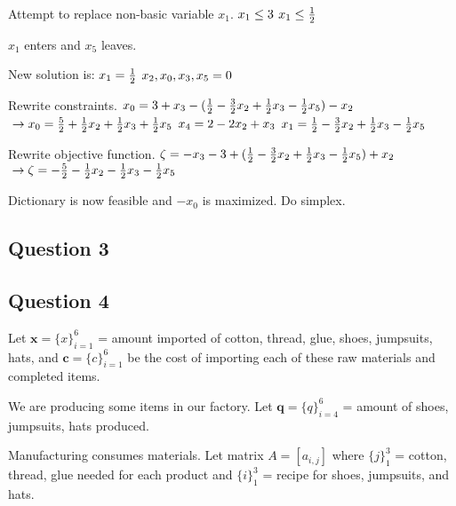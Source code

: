 \documentclass[17pt]{extarticle}
\begin{document}
\bigskip Attempt to replace non-basic variable $x_1$.
$\\ x_1 \leq 3$
$\\ x_1 \leq \frac{1}{2}$

\bigskip $x_1$ enters and $x_5$ leaves.

\bigskip New solution is:
$\\x_1 = \frac{1}{2}$
$\\x_2, x_0, x_3, x_5 = 0$

\bigskip Rewrite constraints.
$\\ x_0 = 3 + x_3 - (\frac{1}{2} - \frac{3}{2}x_2 + \frac{1}{2}x_3 - \frac{1}{2}x_5) - x_2$
$\\\to x_0 = \frac{5}{2} + \frac{1}{2}x_2 + \frac{1}{2}x_3 + \frac{1}{2}x_5$
$\\ x_4 = 2 - 2x_2 + x_3$
$\\ x_1 = \frac{1}{2} - \frac{3}{2}x_2 + \frac{1}{2}x_3 - \frac{1}{2}x_5$

\bigskip Rewrite objective function.
$\\\zeta = -x_3 - 3 + (\frac{1}{2} - \frac{3}{2}x_2 + \frac{1}{2}x_3 - \frac{1}{2}x_5) + x_2$
$\\\to \zeta = - \frac{5}{2} - \frac{1}{2}x_2 - \frac{1}{2}x_3 - \frac{1}{2}x_5$

\bigskip Dictionary is now feasible and $-x_0$ is maximized. Do simplex.

\newpage
\subsection*{Question 3}

\newpage
\subsection*{Question 4}
Let $\textbf{x} = \{x\}_{i=1}^6$ = amount imported of cotton, thread, glue, shoes, jumpsuits, hats, and $\textbf{c} = \{c\}_{i=1}^6$ be the cost of importing each of these raw materials and completed items.

\bigskip We are producing some items in our factory. Let $\textbf{q} = \{q\}_{i=4}^6$ = amount of shoes, jumpsuits, hats produced.

\bigskip Manufacturing consumes materials. Let matrix $A = [a_{i,j}]$ where $\{j\}_1^3$ = cotton, thread, glue needed for each product and $\{i\}_1^3$ = recipe for shoes, jumpsuits, and hats.
\end{document}
